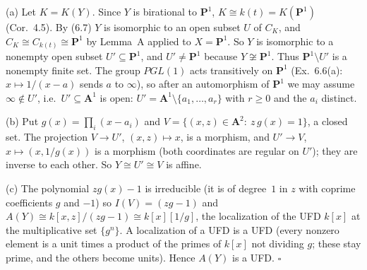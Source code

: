 \documentclass[11pt]{article}
\begin{document}
\pf
(a) Let $K=K(Y)$. Since $Y$ is birational to $\mathbf P^1$, $K\cong k(t)=K(\mathbf P^1)$ (Cor.~4.5). By (6.7) $Y$ is isomorphic to an open subset $U$ of $C_K$, and $C_K\cong C_{k(t)}\cong\mathbf P^1$ by Lemma~A applied to $X=\mathbf P^1$. So $Y$ is isomorphic to a nonempty open subset $U'\subseteq\mathbf P^1$, and $U'\ne\mathbf P^1$ because $Y\not\cong\mathbf P^1$. Thus $\mathbf P^1\setminus U'$ is a nonempty finite set. The group $PGL(1)$ acts transitively on $\mathbf P^1$ (Ex.~6.6(a): $x\mapsto 1/(x-a)$ sends $a$ to $\infty$), so after an automorphism of $\mathbf P^1$ we may assume $\infty\notin U'$, i.e.\ $U'\subseteq\mathbf A^1$ is open: $U'=\mathbf A^1\setminus\{a_1,\dots,a_r\}$ with $r\ge0$ and the $a_i$ distinct.

(b) Put $g(x)=\prod_i(x-a_i)$ and $V=\{(x,z)\in\mathbf A^2:\ z\,g(x)=1\}$, a closed set. The projection $V\to U'$, $(x,z)\mapsto x$, is a morphism, and $U'\to V$, $x\mapsto(x,1/g(x))$ is a morphism (both coordinates are regular on $U'$); they are inverse to each other. So $Y\cong U'\cong V$ is affine.

(c) The polynomial $zg(x)-1$ is irreducible (it is of degree~$1$ in $z$ with coprime coefficients $g$ and $-1$) so $I(V)=(zg-1)$ and $A(Y)\cong k[x,z]/(zg-1)\cong k[x][1/g]$, the localization of the UFD $k[x]$ at the multiplicative set $\{g^n\}$. A localization of a UFD is a UFD (every nonzero element is a unit times a product of the primes of $k[x]$ not dividing $g$; these stay prime, and the others become units). Hence $A(Y)$ is a UFD. \hfill$\square$
\end{document}
